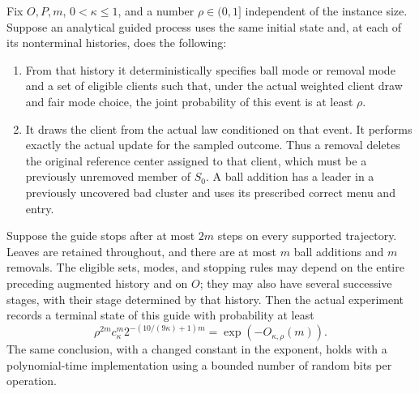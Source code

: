 \begin{lemma}\label{sam:probability}
Fix $O,P,m$, $0<\kappa\le1$, and a number $\rho\in(0,1]$ independent of
the instance size.  Suppose an analytical guided process uses the same
initial state and, at each of its nonterminal histories, does the following:
\begin{enumerate}[label=\textup{(\roman*)}]
\item From that history it deterministically specifies ball mode or removal
      mode and a set of eligible clients
      such that, under the actual weighted client draw and fair mode
      choice, the joint probability of this event is at least $\rho$.
\item It draws the client from the actual law conditioned on that event.
      It performs exactly the actual update for the sampled outcome.
      Thus a removal deletes the original reference center assigned to
      that client, which must be a previously unremoved member of $S_0$.
      A ball
      addition has a leader in a previously uncovered bad cluster and uses
      its prescribed correct menu and entry.
\end{enumerate}
Suppose the guide stops after at most $2m$ steps on every supported
trajectory.  Leaves are retained throughout, and there are at most $m$
ball additions and $m$ removals.  The eligible sets, modes, and stopping
rules may depend on the entire preceding augmented history and on $O$;
they may also have several successive stages, with their stage determined
by that history.  Then the actual experiment records a
terminal state of this guide with probability at least
\begin{equation}
 \rho^{2m}c_\kappa^m
       2^{-(10/(9\kappa)+1)m}
 =\exp(-O_{\kappa,\rho}(m)).
 \label{sam:guided-likelihood}
\end{equation}
The same conclusion, with a changed constant in the exponent, holds with
a polynomial-time implementation using a bounded number of random bits
per operation.
\end{lemma}


